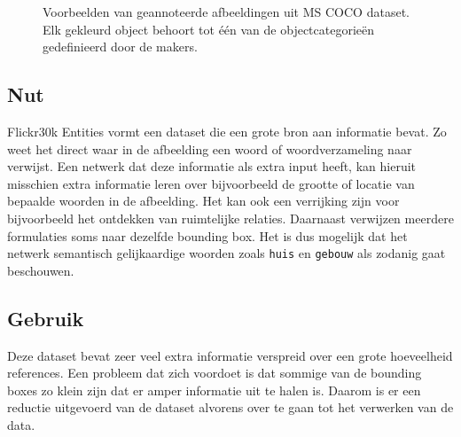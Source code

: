 \begin{figure}
    \centering
    \hfill
    \caption{Voorbeelden van geannoteerde afbeeldingen uit MS COCO dataset. Elk gekleurd object behoort tot \'e\'en van de objectcategorie\"en gedefinieerd door de makers.}
    \label{fig:cocoexamples}
\end{figure}

\subsection{Nut}
Flickr30k Entities vormt een dataset die een grote bron aan informatie bevat. Zo weet het direct waar in de afbeelding een woord of woordverzameling naar verwijst. Een netwerk dat deze informatie als extra input heeft, kan hieruit misschien extra informatie leren over bijvoorbeeld de grootte of locatie van bepaalde woorden in de afbeelding. Het kan ook een verrijking zijn voor bijvoorbeeld het ontdekken van ruimtelijke relaties. Daarnaast verwijzen meerdere formulaties soms naar dezelfde bounding box. Het is dus mogelijk dat het netwerk semantisch gelijkaardige woorden zoals \texttt{huis} en \texttt{gebouw} als zodanig gaat beschouwen.


\subsection{Gebruik}
\label{sub:Gebruik}
Deze dataset bevat zeer veel extra informatie verspreid over een grote hoeveelheid references. Een probleem dat zich voordoet is dat sommige van de bounding boxes zo klein zijn dat er amper informatie uit te halen is. Daarom is er een reductie uitgevoerd van de dataset alvorens over te gaan tot het verwerken van de data. 

